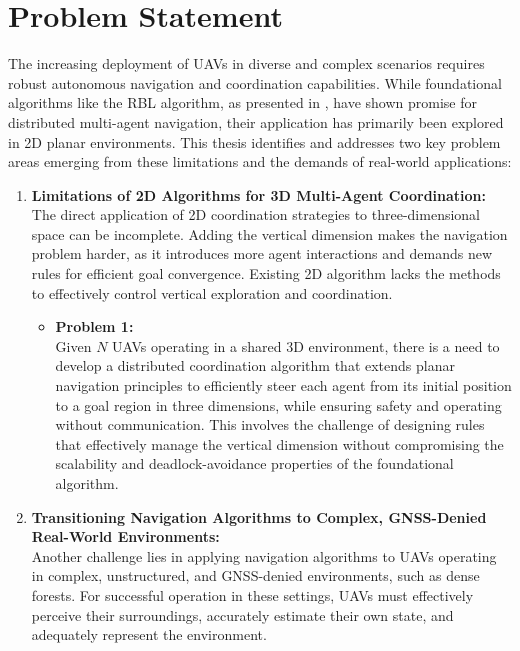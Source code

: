 \section{Problem Statement}
  The increasing deployment of \ac{UAV}s in diverse and complex scenarios requires robust autonomous navigation and coordination capabilities. 
  While foundational algorithms like the \ac{RBL} algorithm, as presented in \cite{rbl_paper}, have shown promise for distributed multi-agent navigation, their application has primarily been explored in 2D planar environments. 
  This thesis identifies and addresses two key problem areas emerging from these limitations and the demands of real-world applications:
  \begin{enumerate}
    \item \textbf{Limitations of 2D Algorithms for 3D Multi-Agent Coordination: } \\
      The direct application of 2D coordination strategies to three-dimensional space can be incomplete. 
      Adding the vertical dimension makes the navigation problem harder, as it introduces more agent interactions and demands new rules for efficient goal convergence.
      Existing 2D algorithm lacks the methods to effectively control vertical exploration and coordination.
      \begin{itemize}
        \item \textbf{Problem 1: } \\
        Given $N$ \ac{UAV}s operating in a shared 3D environment, there is a need to develop a distributed coordination algorithm that extends planar navigation principles to efficiently steer each agent from its initial position to a goal region in three dimensions, while ensuring safety and operating without communication. 
        This involves the challenge of designing rules that effectively manage the vertical dimension without compromising the scalability and deadlock-avoidance properties of the foundational algorithm.
      \end{itemize}
    \item \textbf{Transitioning Navigation Algorithms to Complex, GNSS-Denied Real-World Environments: } \\
      Another challenge lies in applying navigation algorithms to \ac{UAV}s operating in complex, unstructured, and \ac{GNSS}-denied environments, such as dense forests. 
      For successful operation in these settings, \ac{UAV}s must effectively perceive their surroundings, accurately estimate their own state, and adequately represent the environment.

\end{enumerate}
